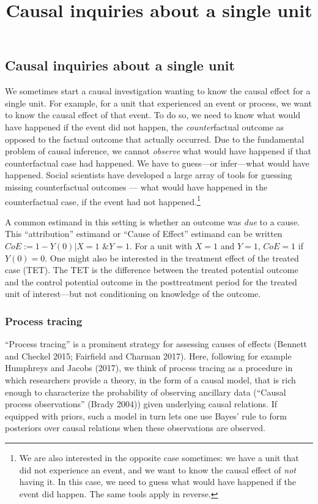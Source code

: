 \documentclass[
]{article}
\title{Causal inquiries about a single unit}
\author{}
\date{\vspace{-2.5em}}
\begin{document}
\maketitle

\hypertarget{causal-inquiries-about-a-single-unit}{%
\subsection{Causal inquiries about a single
unit}\label{causal-inquiries-about-a-single-unit}}

We sometimes start a causal investigation wanting to know the causal
effect for a single unit. For example, for a unit that experienced an
event or process, we want to know the causal effect of that event. To do
so, we need to know what would have happened if the event did not
happen, the \emph{counter}factual outcome as opposed to the factual
outcome that actually occurred. Due to the fundamental problem of causal
inference, we cannot \emph{observe} what would have happened if that
counterfactual case had happened. We have to guess---or infer---what
would have happened. Social scientists have developed a large array of
tools for guessing missing counterfactual outcomes --- what would have
happened in the counterfactual case, if the event had not
happened.\footnote{We are also interested in the opposite case
  sometimes: we have a unit that did not experience an event, and we
  want to know the causal effect of \emph{not} having it. In this case,
  we need to guess what would have happened if the event did happen. The
  same tools apply in reverse.}

A common estimand in this setting is whether an outcome was \emph{due}
to a cause. This ``attribution'' estimand or ``Cause of Effect''
estimand can be written \(CoE:=1-Y(0)| X=1 \text{ \& } Y=1\). For a unit
with \(X=1\) and \(Y=1\), \(CoE=1\) if \(Y(0)=0\). One might also be
interested in the treatment effect of the treated case (TET). The TET is
the difference between the treated potential outcome and the control
potential outcome in the posttreatment period for the treated unit of
interest---but not conditioning on knowledge of the outcome.

\hypertarget{process-tracing}{%
\subsubsection{Process tracing}\label{process-tracing}}

``Process tracing'' is a prominent strategy for assessing causes of
effects (Bennett and Checkel 2015; Fairfield and Charman 2017). Here,
following for example Humphreys and Jacobs (2017), we think of process
tracing as a procedure in which researchers provide a theory, in the
form of a causal model, that is rich enough to characterize the
probability of observing ancillary data (``Causal process observations''
(Brady 2004)) given underlying causal relations. If equipped with
priors, such a model in turn lets one use Bayes' rule to form posteriors
over causal relations when these observations are observed.
\end{document}
